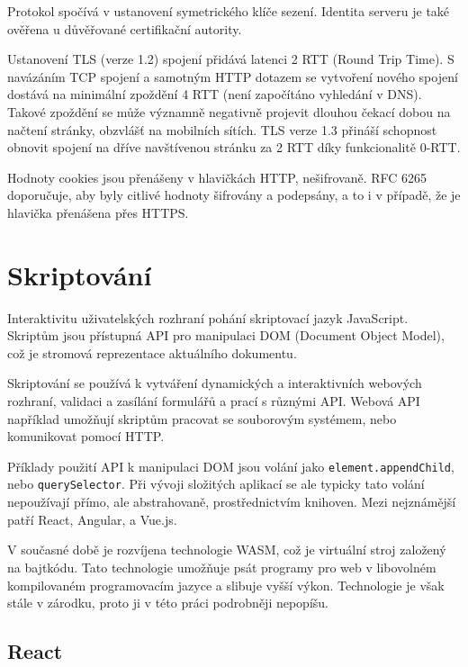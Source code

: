 Protokol spočívá v ustanovení symetrického klíče sezení.
Identita serveru je také ověřena u důvěřované certifikační autority.

Ustanovení TLS (verze 1.2) spojení přidává latenci 2 RTT (Round Trip Time).
S navázáním TCP spojení a samotným HTTP dotazem se vytvoření nového spojení dostává na minimální zpoždění 4 RTT (není započítáno vyhledání v DNS).
Takové zpoždění se může významně negativně projevit dlouhou čekací dobou na načtení stránky, obzvlášť na mobilních sítích.
TLS verze 1.3 přináší schopnost obnovit spojení na dříve navštívenou stránku za 2 RTT díky funkcionalitě 0-RTT. \cite{tls}


Hodnoty cookies jsou přenášeny v hlavičkách HTTP, nešifrovaně.
RFC 6265 \cite{cookies} doporučuje, aby byly citlivé hodnoty šifrovány a podepsány, a to i v případě, že je hlavička přenášena přes HTTPS.

\section{Skriptování}
\label{ui_scripting}

Interaktivitu uživatelských rozhraní pohání skriptovací jazyk JavaScript.
Skriptům jsou přístupná API pro manipulaci DOM (Document Object Model), což je stromová reprezentace aktuálního dokumentu.

Skriptování se používá k vytváření dynamických a interaktivních webových rozhraní, validaci a zasílání formulářů a prací s různými API.
Webová API například umožňují skriptům pracovat se souborovým systémem, nebo komunikovat pomocí HTTP.

Příklady použití API k manipulaci DOM jsou volání jako \texttt{element.appendChild}, nebo \texttt{querySelector}.
Při vývoji složitých aplikací se ale typicky tato volání nepoužívají přímo, ale abstrahovaně, prostřednictvím knihoven.
Mezi nejznámější patří React, Angular, a Vue.js.

V současné době je rozvíjena technologie WASM, což je virtuální stroj založený na bajtkódu.
Tato technologie umožňuje psát programy pro web v libovolném kompilovaném programovacím jazyce a slibuje vyšší výkon.
Technologie je však stále v zárodku, proto ji v této práci podrobněji nepopíšu. 

\subsection{React}

